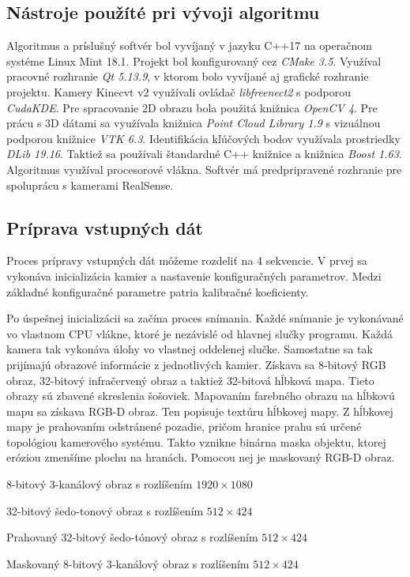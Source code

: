 
\subsection{Nástroje použíté pri vývoji algoritmu}

Algoritmus a príslušný softvér bol vyvíjaný v jazyku C++17 na operačnom systéme Linux Mint 18.1. Projekt bol konfigurovaný cez \textit{CMake 3.5}. Využíval pracovné rozhranie \textit{Qt 5.13.9}, v ktorom bolo vyvíjané aj grafické rozhranie projektu. Kamery Kinecvt v2 využívali ovládač \textit{libfreenect2} s podporou \textit{CudaKDE}. Pre spracovanie 2D obrazu bola použitá knižnica \textit{OpenCV 4}. Pre prácu s 3D dátami sa využívala knižnica \textit{Point Cloud Library 1.9} s vizuálnou podporou knižnice \textit{VTK 6.3}. Identifikácia kľúčových bodov využívala prostriedky \textit{DLib 19.16}. Taktiež sa používali štandardné C++ knižnice a knižnica \textit{Boost 1.63}. Algoritmus využíval procesorové vlákna. Softvér má predpripravené rozhranie pre spoluprácu s kamerami RealSense.      

\subsection{Príprava vstupných dát}
\label{sec:data_prep}
Proces prípravy vstupných dát môžeme rozdeliť na 4 sekvencie.
V prvej sa vykonáva inicializácia kamier a nastavenie konfiguračných parametrov. Medzi základné konfiguračné parametre patria kalibračné koeficienty. 

Po úspešnej inicializácii sa začína proces snímania. Každé snímanie je vykonávané vo vlastnom CPU vlákne, ktoré je nezávislé od hlavnej slučky programu. Každá kamera tak vykonáva úlohy vo vlastnej oddelenej slučke. Samostatne sa tak prijímajú obrazové informácie z jednotlivých kamier. Získava sa 8-bitový RGB obraz, 32-bitový infračervený obraz a taktiež 32-bitová hĺbková mapa. Tieto obrazy sú zbavené skreslenia šošoviek. Mapovaním farebného obrazu na hĺbkovú mapu sa získava RGB-D obraz. Ten popisuje textúru hĺbkovej mapy. Z hĺbkovej mapy je prahovaním odstránené pozadie, pričom hranice prahu sú určené topológiou kamerového systému. Takto vznikne binárna maska objektu, ktorej eróziou zmenšíme plochu na hranách. Pomocou nej je maskovaný RGB-D obraz. 

\begin{description}[leftmargin=*, font=$\bullet$~\normalfont\scshape\color{black}]
	\item[RGB:] 	8-bitový 3-kanálový obraz s rozlíšením $1920 \times 1080$
	\item[IR:]	32-bitový šedo-tonový obraz s rozlíšením $512 \times 424$
	\item[Depth:] Prahovaný 32-bitový šedo-tónový obraz s rozlíšením $512 \times 424$
	\item[RGB-D:] Maskovaný 8-bitový 3-kanálový obraz s rozlíšením $512 \times 424$
\end{description}


